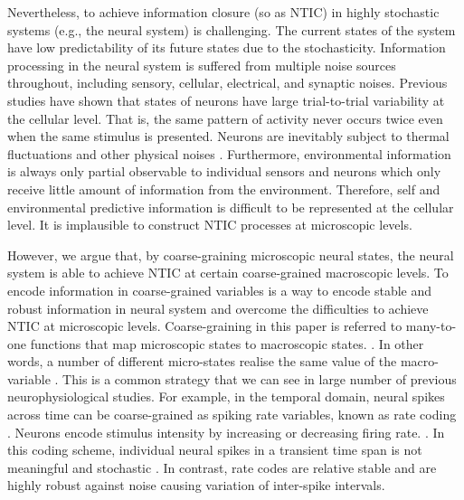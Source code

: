 \documentclass[utf8]{article}
\newcommand{\needref}[1]{%
			\ifthenelse{\equal{#1}{}}{%
				\todo[color=White, linecolor=Orange, bordercolor=Orange]{\textcolor{Orange}{Ref}}}{%
				\todo[color=White, linecolor=Orange, bordercolor=Orange]{\textcolor{Orange}{Ref: #1}}%
			}%
		}
\begin{document}
		Nevertheless, to achieve information closure (so as NTIC) in highly stochastic systems (e.g., the neural system) is challenging. The current states of the system have low predictability of its future states due to the stochasticity. Information processing in the neural system is suffered from multiple noise sources throughout, including sensory, cellular, electrical, and synaptic noises. Previous studies have shown that states of neurons have large trial-to-trial variability at the cellular level. That is, the same pattern of activity never occurs twice even when the same stimulus is presented. Neurons are inevitably subject to thermal fluctuations and other physical noises \citep{faisal2008noise}. Furthermore, environmental information is always only partial observable to individual sensors and neurons which only receive little amount of information from the environment. Therefore, self and environmental predictive information is difficult to be represented at the cellular level. It is implausible to construct NTIC processes at microscopic levels.

		However, we argue that, by coarse-graining microscopic neural states, the neural system is able to achieve NTIC at certain coarse-grained macroscopic levels. To encode information in coarse-grained variables is a way to encode stable and robust information in neural system and overcome the difficulties to achieve NTIC at microscopic levels. Coarse-graining in this paper is referred to many-to-one functions that map microscopic states to macroscopic states.\needref{Do we need reference?}. In other words, a number of different micro-states realise the same value of the macro-variable \citep{price2007causation}. This is a common strategy that we can see in large number of previous neurophysiological studies. For example, in the temporal domain, neural spikes across time can be coarse-grained as spiking rate variables, known as rate coding \citep{adrian1926impulses, gerstner2002spiking, maass2001pulsed, panzeri2015neural, stein2005neuronal}. Neurons encode stimulus intensity by increasing or decreasing firing rate. \citep{kandel2000principles}. In this coding scheme, individual neural spikes in a transient time span is not meaningful and stochastic \citep{stein2005neuronal}. In contrast, rate codes are relative stable and are highly robust against noise causing variation of inter-spike intervals. 
		
\end{document}
